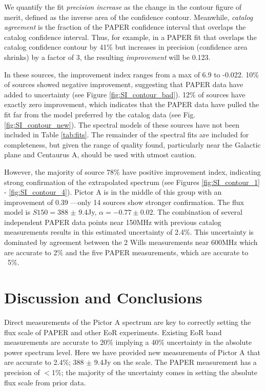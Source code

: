 \documentclass[preprint]{aastex}
\begin{document}
We quantify the fit {\em precision increase} as the change in the contour figure of merit, defined as the inverse area of the confidence contour. Meanwhile, {\em catalog agreement} is the fraction of the PAPER confidence interval that overlaps the catalog confidence interval.  Thus, for example, in a PAPER fit that overlaps the catalog confidence contour by 41\% but increases in precision (confidence area shrinks) by a factor of 3, the resulting {\em improvement} will be 0.123.  

In these sources, the improvement index ranges from a max of 6.9 to -0.022. 10\% of sources showed negative improvement, suggesting that PAPER data have added to uncertainty (see Figure \ref{fig:SI_contour_bad}). 12\% of sources have exactly zero improvement, which indicates that the PAPER data have pulled the fit far from the model preferred by the catalog data (see Fig. \ref{fig:SI_contour_new}).  The spectral models of these sources have not been included in Table \ref{tab:fits}.  The remainder of the spectral fits are included for completeness, but given the range of quality found, particularly near the Galactic plane and Centaurus A, should be used with utmost caution.

However, the majority of source 78\% have positive improvement index, indicating strong confirmation of the extrapolated spectrum (see Figures  \ref{fig:SI_contour_1} - \ref{fig:SI_contour_4}).  Pictor A is in the middle of this group  with an improvement of 0.39 ---only 14 sources show stronger confirmation.  The flux model is $S150=$388 $\pm$ 9.4Jy, $\alpha=-0.77\pm0.02$. The combination of several independent PAPER data points near 150MHz with previous catalog measurements results in this estimated uncertainty of 2.4\%. This uncertainty is dominated by agreement between the 2 Wills measurements near 600MHz which are accurate to 2\% and the five PAPER measurements, which are accurate to ~5\%.


 \section{Discussion and Conclusions}
 \label{sec:Conclusion}
 
Direct measurements of the Pictor A spectrum are key to correctly setting the flux scale of PAPER and other EoR experiments. Existing EoR band measurements are accurate to 20\% implying a 40\% uncertainty in the absolute power spectrum level.  Here we have provided new measurements of Pictor A that are accurate to 2.4\%;  388 $\pm$ 9.4Jy on the \citet{Baars:1977p9678} scale. The PAPER measurement has a precision of $<$1\%; the majority of the uncertainty comes in setting the absolute flux scale from prior data.  
\end{document}
